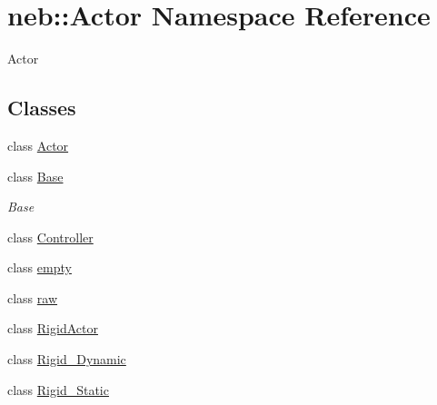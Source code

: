\hypertarget{namespaceneb_1_1Actor}{\section{neb\-:\-:\-Actor \-Namespace \-Reference}
\label{namespaceneb_1_1Actor}
}


\-Actor  


\subsection*{\-Classes}
\begin{DoxyCompactItemize}
\item 
class \hyperlink{classneb_1_1Actor_1_1Actor}{\-Actor}
\item 
class \hyperlink{classneb_1_1Actor_1_1Base}{\-Base}
\begin{DoxyCompactList}\small\item\em \-Base \end{DoxyCompactList}\item 
class \hyperlink{classneb_1_1Actor_1_1Controller}{\-Controller}
\item 
class \hyperlink{classneb_1_1Actor_1_1empty}{empty}
\item 
class \hyperlink{classneb_1_1Actor_1_1raw}{raw}
\item 
class \hyperlink{classneb_1_1Actor_1_1RigidActor}{\-Rigid\-Actor}
\item 
class \hyperlink{classneb_1_1Actor_1_1Rigid__Dynamic}{\-Rigid\-\_\-\-Dynamic}
\item 
class \hyperlink{classneb_1_1Actor_1_1Rigid__Static}{\-Rigid\-\_\-\-Static}
\end{DoxyCompactItemize}
